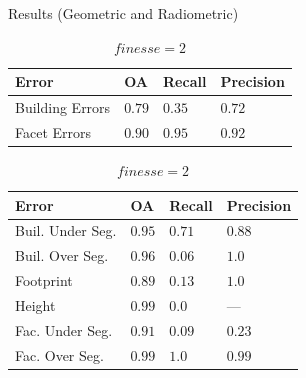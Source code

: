 \documentclass{beamer}
\begin{document}
        \begin{frame}[plain]{Results (Geometric and Radiometric)}
            \begin{table}
                \begin{subtable}{.4\textwidth}
                    \tiny
                    \begin{center}
                        \begin{tabular}{x{1cm} x{.5cm} x{.5cm} x{.5cm}}
                            \toprule
                            {\bf Error} & {\bf OA} & {\bf Recall} & {\bf Precision} \\
                            \midrule
                            Building Errors & $0.79$ & $0.35$ & $0.72$ \\
                            \midrule
                            Facet Errors & $0.90$ & $0.95$ & $0.92$ \\
                            \bottomrule
                        \end{tabular}
                        \caption{\tiny\label{tab::finesse2} $finesse = 2$}
                    \end{center}
                \end{subtable}
                \begin{subtable}{.45\textwidth}
                    \tiny
                    \begin{center}
                        \begin{tabular}{x{1.75cm} x{.5cm} x{.5cm} x{.5cm}}
                            \toprule
                            {\bf Error} & {\bf OA} & {\bf Recall} & {\bf Precision} \\
                            \midrule
                            Buil. Under Seg. & $0.95$ & $0.71$ & $0.88$ \\
                            \midrule
                            Buil. Over Seg. & $0.96$ & $0.06$ & $1.0$ \\
                            \midrule
                            Footprint & $0.89$ & $0.13$ & $1.0$ \\
                            \midrule
                            Height & $0.99$ & $0.0$ & --- \\
                            \midrule
                            \midrule
                            Fac. Under Seg. & $0.91$ & $0.09$ & $0.23$ \\
                            \midrule
                            Fac. Over Seg. & $0.99$ & $1.0$ & $0.99$ \\

\end{tabular}
\end{center}
\end{subtable}
\end{table}
\end{frame}
\end{document}
